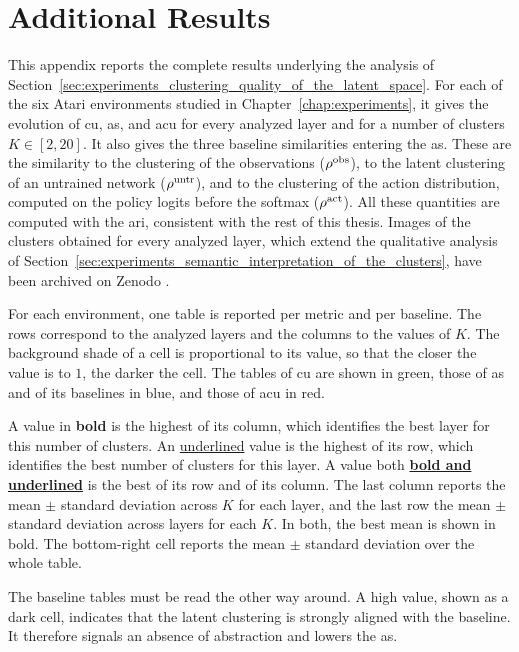 \chapter{Additional Results}
\label{chap:additional_results}

This appendix reports the complete results underlying the analysis of Section~\ref{sec:experiments_clustering_quality_of_the_latent_space}.
For each of the six Atari environments studied in Chapter~\ref{chap:experiments}, it gives the evolution of \gls{cu}, \gls{as}, and \gls{acu} for every analyzed layer and for a number of clusters $K \in [2,20]$.
It also gives the three baseline similarities entering the \gls{as}.
These are the similarity to the clustering of the observations ($\rho^{\mathrm{obs}}_{}$), to the latent clustering of an untrained network ($\rho^{\mathrm{untr}}_{}$), and to the clustering of the action distribution, computed on the policy logits before the softmax ($\rho^{\mathrm{act}}_{}$).
All these quantities are computed with the \gls{ari}, consistent with the rest of this thesis.
Images of the clusters obtained for every analyzed layer, which extend the qualitative analysis of Section~\ref{sec:experiments_semantic_interpretation_of_the_clusters}, have been archived on Zenodo \LinkClusterImages.

For each environment, one table is reported per metric and per baseline.
The rows correspond to the analyzed layers and the columns to the values of $K$.
The background shade of a cell is proportional to its value, so that the closer the value is to $1$, the darker the cell.
The tables of \gls{cu} are shown in green, those of \gls{as} and of its baselines in blue, and those of \gls{acu} in red.

A value in \textbf{bold} is the highest of its column, which identifies the best layer for this number of clusters.
An \underline{underlined} value is the highest of its row, which identifies the best number of clusters for this layer.
A value both \textbf{\underline{bold and underlined}} is the best of its row and of its column.
The last column reports the mean $\pm$ standard deviation across $K$ for each layer, and the last row the mean $\pm$ standard deviation across layers for each $K$.
In both, the best mean is shown in bold.
The bottom-right cell reports the mean $\pm$ standard deviation over the whole table.

The baseline tables must be read the other way around.
A high value, shown as a dark cell, indicates that the latent clustering is strongly aligned with the baseline.
It therefore signals an absence of abstraction and lowers the \gls{as}.

